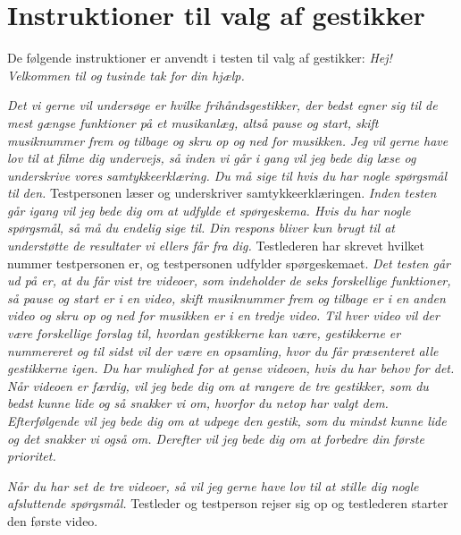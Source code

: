 \chapter{Instruktioner til valg af gestikker}
\label{app:InstruktionerValgAfGestikker}
%
De følgende instruktioner er anvendt i testen til valg af gestikker:\blankline
%
\textit{Hej! Velkommen til og tusinde tak for din hjælp.} 

\textit{Det vi gerne vil undersøge er hvilke frihåndsgestikker, der bedst egner sig til de mest gængse funktioner på et musikanlæg, altså pause og start, skift musiknummer frem og tilbage og skru op og ned for musikken. Jeg vil gerne have lov til at filme dig undervejs, så inden vi går i gang vil jeg bede dig læse og underskrive vores samtykkeerklæring. Du må sige til hvis du har nogle spørgsmål til den.}\blankline
%
Testpersonen læser og underskriver samtykkeerklæringen. \blankline
%  
\textit{Inden testen går igang vil jeg bede dig om at udfylde et spørgeskema. Hvis du har nogle spørgsmål, så må du endelig sige til. Din respons bliver kun brugt til at understøtte de resultater vi ellers får fra dig.} \blankline
%
Testlederen har skrevet hvilket nummer testpersonen er, og testpersonen udfylder spørgeskemaet.\blankline
%  
\textit{Det testen går ud på er, at du får vist tre videoer, som indeholder de seks forskellige funktioner, så pause og start er i en video, skift musiknummer frem og tilbage er i en anden video og skru op og ned for musikken er i en tredje video. Til hver video vil der være forskellige forslag til, hvordan gestikkerne kan være, gestikkerne er nummereret og til sidst vil der være en opsamling, hvor du får præsenteret alle gestikkerne igen. Du har mulighed for at gense videoen, hvis du har behov for det. Når videoen er færdig, vil jeg bede dig om at rangere de tre gestikker, som du bedst kunne lide og så snakker vi om, hvorfor du netop har valgt dem. Efterfølgende vil jeg bede dig om at udpege den gestik, som du mindst kunne lide og det snakker vi også om. Derefter vil jeg bede dig om at forbedre din første prioritet.} 

\textit{Når du har set de tre videoer, så vil jeg gerne have lov til at stille dig nogle afsluttende spørgsmål.}\blankline
%
Testleder og testperson rejser sig op og testlederen starter den første video. 
% 
